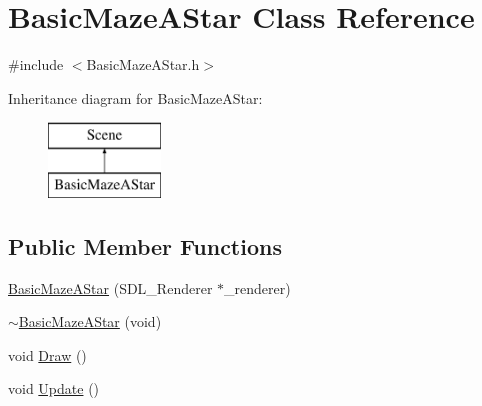 \hypertarget{class_basic_maze_a_star}{\section{Basic\-Maze\-A\-Star Class Reference}
\label{class_basic_maze_a_star}
}


{\ttfamily \#include $<$Basic\-Maze\-A\-Star.\-h$>$}

Inheritance diagram for Basic\-Maze\-A\-Star\-:\begin{figure}[H]
\begin{center}
\leavevmode
\includegraphics[height=2.000000cm]{class_basic_maze_a_star}
\end{center}
\end{figure}
\subsection*{Public Member Functions}
\begin{DoxyCompactItemize}
\item 
\hyperlink{class_basic_maze_a_star_a18afda3905b94b4a559bbb67324f5b5c}{Basic\-Maze\-A\-Star} (S\-D\-L\-\_\-\-Renderer $\ast$\-\_\-renderer)
\item 
\hyperlink{class_basic_maze_a_star_acaced8c2875e8544790f02d3e51aa25c}{$\sim$\-Basic\-Maze\-A\-Star} (void)
\item 
void \hyperlink{class_basic_maze_a_star_a4734bf9b21100b2dec42c44a0aa5421b}{Draw} ()
\item 
void \hyperlink{class_basic_maze_a_star_aca11eda868180204813e3e7ded4dbf81}{Update} ()
\end{DoxyCompactItemize}


